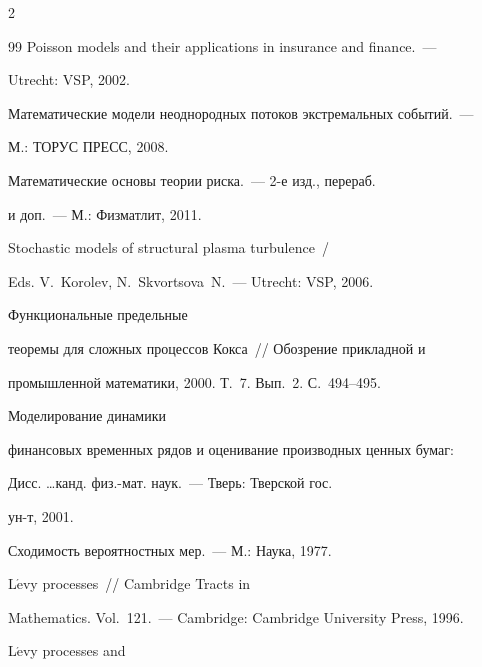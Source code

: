 \begin{multicols}{2}
{{\begin{thebibliography}{99}
Poisson models and their applications in insurance and finance.~---

Utrecht: VSP, 2002.



 

Математические модели неоднородных потоков экстремальных событий.~---

М.: ТОРУС ПРЕСС, 2008.



  Математические основы теории риска.~--- 2-е изд., перераб.

и доп.~--- М.: Физматлит, 2011.




Stochastic models of structural plasma turbulence~/

Eds. V.~Korolev, N.~Skvortsova~N.~--- Utrecht: VSP, 2006.



  Функциональные предельные

теоремы для сложных процессов Кокса~// Обозрение прикладной и

промышленной математики, 2000. Т.~7. Вып.~2. С.~494--495.




 Моделирование динамики

финансовых временных рядов и оценивание производных ценных бумаг:

Дисс. \ldots канд. физ.-мат. наук.~--- Тверь: Тверской гос.

ун-т, 2001.



  Сходимость вероятностных мер.~--- М.: Наука, 1977.




 L$\acute{\mbox{e}}$vy processes~// Cambridge Tracts in

Mathematics. Vol.~121.~--- Cambridge: Cambridge University Press, 1996.



  L$\acute{\mbox{e}}$vy processes and


\end{thebibliography}}}
\end{multicols}
